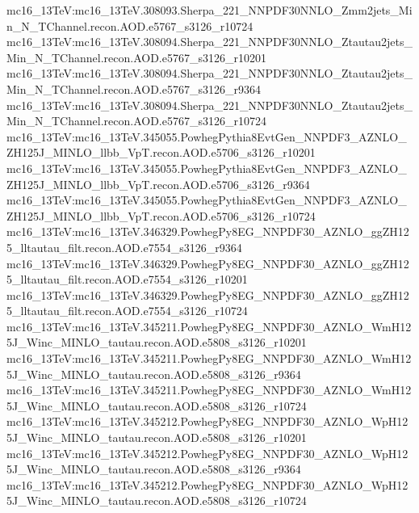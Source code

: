 { mc16\_13TeV:mc16\_13TeV.308093.Sherpa\_221\_NNPDF30NNLO\_Zmm2jets\_Min\_N\_TChannel.recon.AOD.e5767\_s3126\_r10724  \newline   
 mc16\_13TeV:mc16\_13TeV.308094.Sherpa\_221\_NNPDF30NNLO\_Ztautau2jets\_Min\_N\_TChannel.recon.AOD.e5767\_s3126\_r10201   \newline  
 mc16\_13TeV:mc16\_13TeV.308094.Sherpa\_221\_NNPDF30NNLO\_Ztautau2jets\_Min\_N\_TChannel.recon.AOD.e5767\_s3126\_r9364 \newline    
 mc16\_13TeV:mc16\_13TeV.308094.Sherpa\_221\_NNPDF30NNLO\_Ztautau2jets\_Min\_N\_TChannel.recon.AOD.e5767\_s3126\_r10724  \newline  
 mc16\_13TeV:mc16\_13TeV.345055.PowhegPythia8EvtGen\_NNPDF3\_AZNLO\_ZH125J\_MINLO\_llbb\_VpT.recon.AOD.e5706\_s3126\_r10201  \newline   
 mc16\_13TeV:mc16\_13TeV.345055.PowhegPythia8EvtGen\_NNPDF3\_AZNLO\_ZH125J\_MINLO\_llbb\_VpT.recon.AOD.e5706\_s3126\_r9364  \newline   
 mc16\_13TeV:mc16\_13TeV.345055.PowhegPythia8EvtGen\_NNPDF3\_AZNLO\_ZH125J\_MINLO\_llbb\_VpT.recon.AOD.e5706\_s3126\_r10724  \newline   
 mc16\_13TeV:mc16\_13TeV.346329.PowhegPy8EG\_NNPDF30\_AZNLO\_ggZH125\_lltautau\_filt.recon.AOD.e7554\_s3126\_r9364 \newline    
 mc16\_13TeV:mc16\_13TeV.346329.PowhegPy8EG\_NNPDF30\_AZNLO\_ggZH125\_lltautau\_filt.recon.AOD.e7554\_s3126\_r10201  \newline   
 mc16\_13TeV:mc16\_13TeV.346329.PowhegPy8EG\_NNPDF30\_AZNLO\_ggZH125\_lltautau\_filt.recon.AOD.e7554\_s3126\_r10724  \newline   
 mc16\_13TeV:mc16\_13TeV.345211.PowhegPy8EG\_NNPDF30\_AZNLO\_WmH125J\_Winc\_MINLO\_tautau.recon.AOD.e5808\_s3126\_r10201  \newline   
 mc16\_13TeV:mc16\_13TeV.345211.PowhegPy8EG\_NNPDF30\_AZNLO\_WmH125J\_Winc\_MINLO\_tautau.recon.AOD.e5808\_s3126\_r9364 \newline    
 mc16\_13TeV:mc16\_13TeV.345211.PowhegPy8EG\_NNPDF30\_AZNLO\_WmH125J\_Winc\_MINLO\_tautau.recon.AOD.e5808\_s3126\_r10724 \newline    
 mc16\_13TeV:mc16\_13TeV.345212.PowhegPy8EG\_NNPDF30\_AZNLO\_WpH125J\_Winc\_MINLO\_tautau.recon.AOD.e5808\_s3126\_r10201  \newline   
 mc16\_13TeV:mc16\_13TeV.345212.PowhegPy8EG\_NNPDF30\_AZNLO\_WpH125J\_Winc\_MINLO\_tautau.recon.AOD.e5808\_s3126\_r9364  \newline   
 mc16\_13TeV:mc16\_13TeV.345212.PowhegPy8EG\_NNPDF30\_AZNLO\_WpH125J\_Winc\_MINLO\_tautau.recon.AOD.e5808\_s3126\_r10724 \newline    
}
